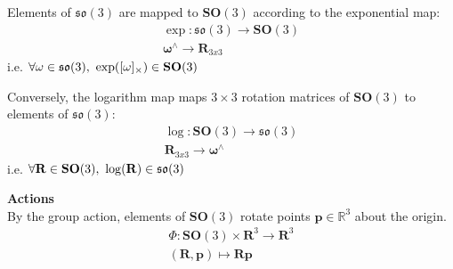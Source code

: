 		Elements of $\mathfrak{so}(3)$ are mapped to $\textbf{SO}(3)$ according to the exponential map:
		\begin{equation}
			\begin{split}
				\exp: \mathfrak{so}(3) \rightarrow \mathbf{SO}(3)\\
				\bm{\omega}^{\wedge} \rightarrow \mathbf{R}_{3x3}
			\end{split}		
		\end{equation}		
		i.e. $\forall \omega \in \mathfrak{so}(3) \textnormal{, } \exp([\omega]_\times) \in  \mathbf{SO}(3)$
		
		Conversely, the logarithm map maps $3 \times 3$ rotation matrices of $\mathbf{SO}(3)$ to elements of $\mathfrak{so}(3)$:
		\begin{equation}
			\begin{split}
				\log: \mathbf{SO}(3) \rightarrow \mathfrak{so}(3)\\
				 \mathbf{R}_{3x3} \rightarrow \bm{\omega}^{\wedge}
			\end{split}		
		\end{equation}		
		i.e. $\forall \mathbf{R} \in \mathbf{SO}(3)  \textnormal{, } \log(\mathbf{R}) \in  \mathfrak{so}(3)$
				
		\textbf{Actions}\\
		By the group action, elements of $\mathbf{SO}(3)$ rotate points $\mathbf{p} \in \mathbb{R}^3$ about the origin. 
		\begin{equation}
			\begin{split}
				\Phi: \mathbf{SO}(3) \times \mathbf{R}^3 \rightarrow \mathbf{R}^3\\
				(\mathbf{R},\mathbf{p}) \mapsto \mathbf{Rp}
			\end{split}	
		\end{equation}
		
		\begin{comment}
		\textbf{Adjoint map}\\
		EXPLANATION???? Hard to explain practical application without discussing reference frames: ie if position defined in body fixed frame but some other transformation defined in inertial frame. First undo rotation to get pose in inertial frame, apply transformation, then re-apply rotation.
		\begin{equation}
			\Psi_R: \mathbf{SO}(3) \rightarrow \mathbf{SO}(3) \textnormal{, }
			\Psi_R(A) \stackrel{\Delta}{=} RAR^{-1}
		\end{equation}
		Taking the derivative:
		\begin{equation}
			\frac{\partial}{\partial t} \Psi_R(A(t))|_{t=0} = RBR^{-1} \textnormal{, }
			B \stackrel{\Delta}{=} 	\frac{\partial}{\partial t}A(t)|_{t=0}
		\end{equation}
		The adjoint	representation of $\mathbf{SO}(3)$ is given by the mapping
		\begin{equation}
			\textbf{Adj}_R: \mathfrak{so}(3) \rightarrow \mathfrak{so}(3) \textnormal{, }
			\textbf{Adj}_R(B) \stackrel{\Delta}{=} RBR^{-1}
		\end{equation}
		\end{comment}
		
